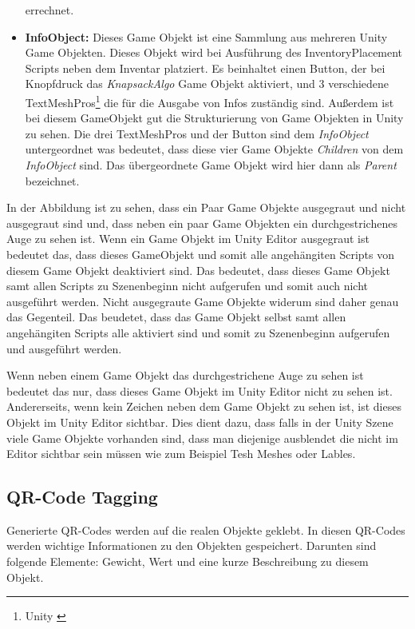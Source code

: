 \begin{itemize}
    errechnet.
    \item \textbf{InfoObject:} Dieses Game Objekt ist eine Sammlung aus mehreren Unity Game Objekten. Dieses Objekt wird
    bei Ausführung des InventoryPlacement Scripts neben dem Inventar platziert. Es beinhaltet einen Button, der bei Knopfdruck
    das \textit{KnapsackAlgo} Game Objekt aktiviert, und 3 verschiedene TextMeshPros\footnote{Unity \cite{TextMesh}} die
    für die Ausgabe von Infos zuständig sind.
    Außerdem ist bei diesem GameObjekt gut die Strukturierung von Game Objekten in Unity zu sehen. Die drei TextMeshPros
    und der Button sind dem \textit{InfoObject} untergeordnet was bedeutet, dass diese vier Game Objekte \textit{Children}
    von dem \textit{InfoObject} sind. Das übergeordnete Game Objekt wird hier dann als \textit{Parent} bezeichnet.
\end{itemize}

In der Abbildung ist zu sehen, dass ein Paar Game Objekte ausgegraut und nicht ausgegraut sind und, dass neben ein paar Game Objekten ein durchgestrichenes Auge zu sehen ist.
Wenn ein Game Objekt im Unity Editor ausgegraut ist bedeutet das, dass dieses GameObjekt und somit alle angehängiten Scripts von diesem Game Objekt deaktiviert sind.
Das bedeutet, dass dieses Game Objekt samt allen Scripts zu Szenenbeginn nicht aufgerufen und somit auch nicht ausgeführt werden. Nicht ausgegraute Game Objekte widerum sind
daher genau das Gegenteil. Das beudetet, dass das Game Objekt selbst samt allen angehängiten Scripts alle aktiviert sind und somit zu Szenenbeginn aufgerufen und ausgeführt werden.

Wenn neben einem Game Objekt das durchgestrichene Auge zu sehen ist bedeutet das nur, dass dieses Game Objekt im Unity Editor nicht zu sehen ist. Andererseits, wenn kein Zeichen
neben dem Game Objekt zu sehen ist, ist dieses Objekt im Unity Editor sichtbar. Dies dient dazu, dass falls in der Unity Szene viele Game Objekte vorhanden sind, dass man
diejenige ausblendet die nicht im Editor sichtbar sein müssen wie zum Beispiel Tesh Meshes oder Lables.

\subsection{QR-Code Tagging}
Generierte QR-Codes werden auf die realen Objekte geklebt. In diesen QR-Codes werden
wichtige Informationen zu den Objekten gespeichert. Darunten sind folgende Elemente:
Gewicht, Wert und eine kurze Beschreibung zu diesem Objekt.

